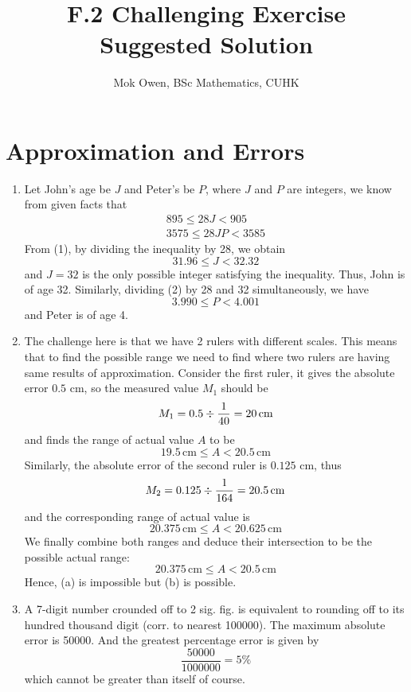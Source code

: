 \documentclass[12pt]{article}
\title{F.2 Challenging Exercise\\Suggested Solution}
\author{Mok Owen, BSc Mathematics, CUHK}
\begin{document}
    \maketitle

    \newpage

    \tableofcontents

    \newpage

    \section{Approximation and Errors}

    \begin{enumerate}
        \item Let John's age be $J$ and Peter's be $P$, where $J$ and $P$ are integers, we know from given facts that \begin{align}
            895\leq 28J < 905\\
            3575\leq 28JP < 3585
        \end{align}
        From (1), by dividing the inequality by 28, we obtain \[31.96\leq J< 32.32\] and $J=32$ is the only possible integer satisfying the inequality. Thus, John is of age 32. Similarly, dividing (2) by 28 and 32 simultaneously, we have \[3.990\leq P< 4.001\] and Peter is of age 4.
        \item The challenge here is that we have 2 rulers with different scales. This means that to find the possible range we need to find where two rulers are having same results of approximation. Consider the first ruler, it gives the absolute error $0.5$ cm, so the measured value $M_1$ should be \[M_1 = 0.5 \divisionsymbol \frac{1}{40} = 20  \, \mathrm{cm}\] and finds the range of actual value $A$ to be \[19.5 \, \mathrm{cm} \leq A < 20.5\, \mathrm{cm}\]Similarly, the absolute error of the second ruler is $0.125$ cm, thus \[M_2 = 0.125\divisionsymbol \frac{1}{164} = 20.5 \, \mathrm{cm}\] and the corresponding range of actual value is \[20.375 \, \mathrm{cm}\leq A < 20.625 \, \mathrm{cm}\] We finally combine both ranges and deduce their intersection to be the possible actual range: \[20.375\, \mathrm{cm}\leq A < 20.5 \, \mathrm{cm}\]Hence, (a) is impossible but (b) is possible.
        \item A 7-digit number crounded off to 2 sig. fig. is equivalent to rounding off to its hundred thousand digit (corr. to nearest 100000). The maximum absolute error is 50000. And the greatest percentage error is given by \[\frac{50000}{1000000} = 5\%\] which cannot be greater than itself of course.

\end{enumerate}
\end{document}

